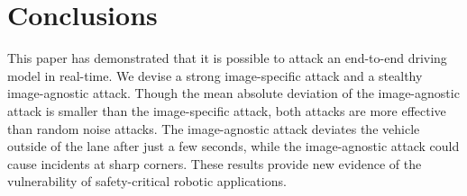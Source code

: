 \addtolength{\textheight}{-2cm}


\section{Conclusions}

This paper has demonstrated that it is possible to attack an end-to-end driving model in real-time. We devise a strong image-specific attack and a stealthy image-agnostic attack. Though the mean absolute deviation of the image-agnostic attack is smaller than the image-specific attack, both attacks are more effective than random noise attacks. The image-agnostic attack deviates the vehicle outside of the lane after just a few seconds, while the image-agnostic attack could cause incidents at sharp corners. These results provide new evidence of the vulnerability of safety-critical robotic applications.



